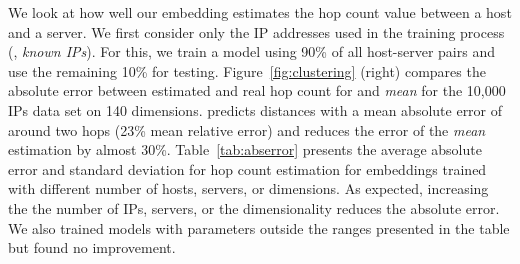 %


We look at how well our embedding estimates the hop count value between a host and a server. We first consider only the IP addresses used in the training process (\ie{}, {\em known IPs}). For this, we train a model using 90\% of all host-server pairs and use the remaining 10\% for testing. Figure~\ref{fig:clustering} (right) compares the absolute error between estimated and real hop count for \system{} and {\em mean} for the 10,000 IPs data set on 140 dimensions. \system{} predicts distances with a mean absolute error of around two hops (23\% mean relative error) and reduces the error of the {\em mean} estimation by almost 30\%.
%
Table~\ref{tab:abserror} presents the average absolute error and standard deviation for hop count estimation for embeddings trained with different number of hosts, servers, or dimensions. As expected, increasing the the number of IPs, servers, or the dimensionality reduces the absolute error. We also trained models with parameters outside the ranges presented in the table but found no improvement.







